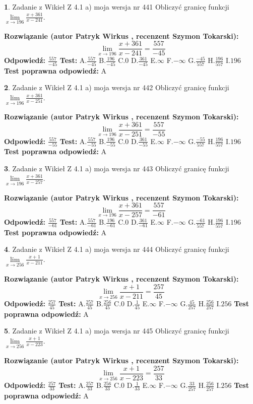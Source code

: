\documentclass[12pt, a4paper]{article}
\theoremstyle{definition} %
\newtheorem{zad}{}
\newcommand{\zadStart}[1]{\begin{zad}#1\newline}
\newcommand{\zadStop}{\end{zad}}
\newcommand{\rozwStart}[2]{\noindent \textbf{Rozwiązanie (autor #1 , recenzent #2): }\newline}
\newcommand{\rozwStop}{\newline}
\newcommand{\odpStart}{\noindent \textbf{Odpowiedź:}\newline}
\newcommand{\odpStop}{\newline}
\newcommand{\testStart}{\noindent \textbf{Test:}\newline}
\newcommand{\testStop}{\newline}
\newcommand{\kluczStart}{\noindent \textbf{Test poprawna odpowiedź:}\newline}
\newcommand{\kluczStop}{\newline}
\begin{document}
\zadStart{Zadanie z Wikieł Z 4.1 a) moja wersja nr 441}
Obliczyć granicę funkcji $\lim\limits_{x\to196}\frac{x+361}{x-241}$.
\zadStop
\rozwStart{Patryk Wirkus}{Szymon Tokarski}
$$\lim\limits_{x\to196}\frac{x+361}{x-241} = \frac{557}{-45}$$
\rozwStop
\odpStart
$\frac{557}{-45}$
\odpStop
\testStart
A.$\frac{557}{-45}$
B.$\frac{196}{-45}$
C.$0$
D.$\frac{361}{-45}$
E.$\infty$
F.$-\infty$
G.$\frac{-45}{557}$
H.$\frac{196}{557}$
I.$196$
\testStop
\kluczStart
A
\kluczStop



\zadStart{Zadanie z Wikieł Z 4.1 a) moja wersja nr 442}
Obliczyć granicę funkcji $\lim\limits_{x\to196}\frac{x+361}{x-251}$.
\zadStop
\rozwStart{Patryk Wirkus}{Szymon Tokarski}
$$\lim\limits_{x\to196}\frac{x+361}{x-251} = \frac{557}{-55}$$
\rozwStop
\odpStart
$\frac{557}{-55}$
\odpStop
\testStart
A.$\frac{557}{-55}$
B.$\frac{196}{-55}$
C.$0$
D.$\frac{361}{-55}$
E.$\infty$
F.$-\infty$
G.$\frac{-55}{557}$
H.$\frac{196}{557}$
I.$196$
\testStop
\kluczStart
A
\kluczStop



\zadStart{Zadanie z Wikieł Z 4.1 a) moja wersja nr 443}
Obliczyć granicę funkcji $\lim\limits_{x\to196}\frac{x+361}{x-257}$.
\zadStop
\rozwStart{Patryk Wirkus}{Szymon Tokarski}
$$\lim\limits_{x\to196}\frac{x+361}{x-257} = \frac{557}{-61}$$
\rozwStop
\odpStart
$\frac{557}{-61}$
\odpStop
\testStart
A.$\frac{557}{-61}$
B.$\frac{196}{-61}$
C.$0$
D.$\frac{361}{-61}$
E.$\infty$
F.$-\infty$
G.$\frac{-61}{557}$
H.$\frac{196}{557}$
I.$196$
\testStop
\kluczStart
A
\kluczStop



\zadStart{Zadanie z Wikieł Z 4.1 a) moja wersja nr 444}
Obliczyć granicę funkcji $\lim\limits_{x\to256}\frac{x+1}{x-211}$.
\zadStop
\rozwStart{Patryk Wirkus}{Szymon Tokarski}
$$\lim\limits_{x\to256}\frac{x+1}{x-211} = \frac{257}{45}$$
\rozwStop
\odpStart
$\frac{257}{45}$
\odpStop
\testStart
A.$\frac{257}{45}$
B.$\frac{256}{45}$
C.$0$
D.$\frac{1}{45}$
E.$\infty$
F.$-\infty$
G.$\frac{45}{257}$
H.$\frac{256}{257}$
I.$256$
\testStop
\kluczStart
A
\kluczStop



\zadStart{Zadanie z Wikieł Z 4.1 a) moja wersja nr 445}
Obliczyć granicę funkcji $\lim\limits_{x\to256}\frac{x+1}{x-223}$.
\zadStop
\rozwStart{Patryk Wirkus}{Szymon Tokarski}
$$\lim\limits_{x\to256}\frac{x+1}{x-223} = \frac{257}{33}$$
\rozwStop
\odpStart
$\frac{257}{33}$
\odpStop
\testStart
A.$\frac{257}{33}$
B.$\frac{256}{33}$
C.$0$
D.$\frac{1}{33}$
E.$\infty$
F.$-\infty$
G.$\frac{33}{257}$
H.$\frac{256}{257}$
I.$256$
\testStop
\kluczStart
A
\kluczStop
\end{document}
